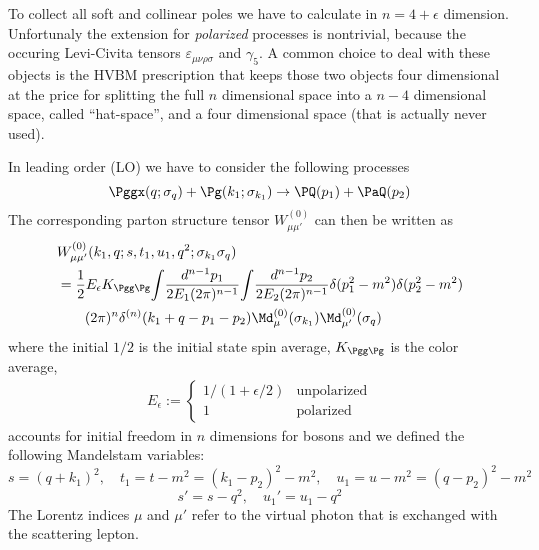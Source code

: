 To collect all soft and collinear poles we have to calculate in $n=4+\epsilon$ dimension. Unfortunaly the extension for \textit{polarized} processes is nontrivial, because the occuring Levi-Civita tensors $\varepsilon_{\mu\nu\rho\sigma}$ and $\gamma_5$. A common choice to deal with these objects is the HVBM prescription\cite{breitenlohner1977} that keeps those two objects four dimensional at the price for splitting the full $n$ dimensional space into a $n-4$ dimensional space, called \enquote{hat-space}, and a four dimensional space (that is actually never used).

In leading order (LO) we have to consider the following processes
\begin{equation}
\Pggx(q;\sigma_q) + \Pg(k_1;\sigma_{k_1}) \rightarrow \PQ(p_1)+\PaQ(p_2)
\end{equation}
The corresponding parton structure tensor $W_{\mu\mu'}^{(0)}$ can then be written as
\begin{align}
&W_{\mu\mu'}^{(0)}(k_1,q;s,t_1,u_1,q^2;\sigma_{k_1}\sigma_{q})\nonumber\\
 &= \frac 1 2 E_\epsilon K_{\Pgg\Pg}\!\int\!\frac{d^{n-1}p_1}{2E_1(2\pi)^{n-1}}\!\int\!\frac{d^{n-1}p_2}{2E_2(2\pi)^{n-1}}\delta(p_1^2-m^2) \delta(p_2^2-m^2)\nonumber\\
 &\hspace{20pt}(2\pi)^n\delta^{(n)}(k_1+q-p_1-p_2) \Md_{\mu}^{(0)}(\sigma_{k_1})\Md_{\mu'}^{(0)}(\sigma_q)
\end{align}
where the initial $1/2$ is the initial state spin average, $K_{\Pgg\Pg}$ is the color average,
\begin{align}
E_\epsilon := \left\{\begin{array}{ll}
1/(1+\epsilon/2) &\text{unpolarized}\\
1 &\text{polarized}
\end{array}\right.
\end{align}
accounts for initial freedom in $n$ dimensions for bosons and we defined the following Mandelstam variables:
\begin{equation}
s = (q+k_1)^2, \quad t_1=t-m^2=(k_1-p_2)^2-m^2, \quad u_1 = u - m^2 = (q-p_2)^2 -m^2
\end{equation}
\begin{equation}
s' = s-q^2,\quad u_1' = u_1 - q^2
\end{equation}
The Lorentz indices $\mu$ and $\mu'$ refer to the virtual photon that is exchanged with the scattering lepton.

